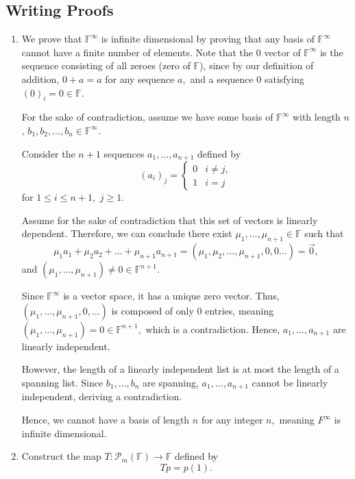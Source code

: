 \documentclass[12pt]{article}
\begin{document}
\subsection{Writing Proofs}
\begin{enumerate}
  \item We prove that $\mathbb F^{\infty}$ is infinite dimensional by
    proving that any basis of $\mathbb F^{\infty}$ cannot have a
    finite number of elements. Note that the $0$ vector of $\mathbb
    F^{\infty}$ is the sequence consisting of all zeroes (zero of
    $\mathbb F$), since by our definition of addition, $0 + a = a$
    for any sequence $a,$ and a sequence $0$ satisfying $(0)_i = 0
    \in \mathbb F.$

    For the sake of contradiction, assume we have some basis of
    $\mathbb F^{\infty}$ with length $n$, $b_1, b_2, \ldots, b_n \in
    \mathbb F^{\infty}.$

    Consider the $n + 1$ sequences $a_1, \ldots, a_{n + 1}$ defined by
    $$
    (a_{i})_j =
    \begin{cases}
      0 & i \neq j,  \\
      1  & i = j
    \end{cases}
    $$
    for $1 \leq i \leq n + 1,$ $j \geq 1.$

    Assume for the sake of contradiction that this set of vectors is
    linearly dependent. Therefore, we can conclude there exist
    $\mu_1, \ldots, \mu_{n+1} \in \mathbb F$ such that
    $$
    \mu_1 a_1 + \mu_2 a_2 + \ldots + \mu_{n+1} a_{n+1} = (\mu_1,
    \mu_2, \ldots, \mu_{n + 1}, 0, 0 \ldots) = \vec 0,
    $$
    and $(\mu_1, \ldots, \mu_{n + 1}) \neq 0 \in \mathbb F^{n + 1}.$

    Since $\mathbb F^{\infty}$ is a vector space, it has a unique
    zero vector. Thus, $(\mu_1, \ldots, \mu_{n + 1}, 0, \ldots)$ is
    composed of only $0$ entries, meaning $(\mu_1, \ldots, \mu_{n +
    1}) = 0 \in \mathbb F^{n + 1},$ which is a contradiction. Hence,
    $a_1, \ldots, a_{n + 1}$ are linearly independent.

    However, the length of a linearly independent list is at most the
    length of a spanning list. Since $b_1, \ldots, b_{n}$ are
    spanning, $a_1, \ldots, a_{n + 1}$ cannot be linearly
    independent, deriving a contradiction.

    Hence, we cannot have a basis of length $n$ for any integer $n,$
    meaning $F^{\infty}$ is infinite dimensional.

  \item Construct the map $T: \mathcal P_m(\mathbb F) \to \mathbb F$ defined by
    $$
    Tp = p(1).
    $$


\end{enumerate}
\end{document}
